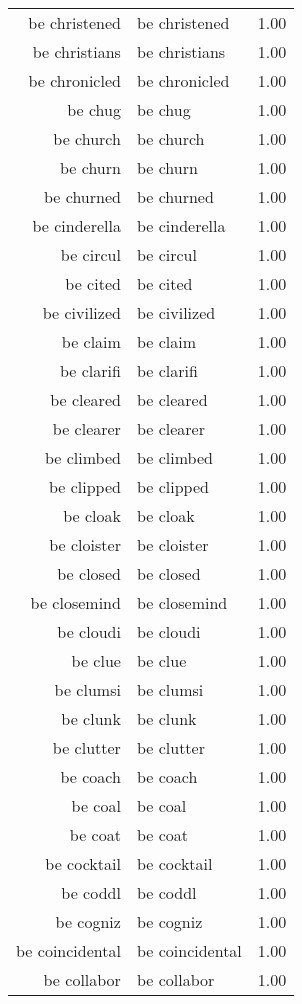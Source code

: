 \begin{table}[ht]
\begin{tabular}{rlr}
  be christened & be christened & 1.00 \\ 
  be christians & be christians & 1.00 \\ 
  be chronicled & be chronicled & 1.00 \\ 
  be chug & be chug & 1.00 \\ 
  be church & be church & 1.00 \\ 
  be churn & be churn & 1.00 \\ 
  be churned & be churned & 1.00 \\ 
  be cinderella & be cinderella & 1.00 \\ 
  be circul & be circul & 1.00 \\ 
  be cited & be cited & 1.00 \\ 
  be civilized & be civilized & 1.00 \\ 
  be claim & be claim & 1.00 \\ 
  be clarifi & be clarifi & 1.00 \\ 
  be cleared & be cleared & 1.00 \\ 
  be clearer & be clearer & 1.00 \\ 
  be climbed & be climbed & 1.00 \\ 
  be clipped & be clipped & 1.00 \\ 
  be cloak & be cloak & 1.00 \\ 
  be cloister & be cloister & 1.00 \\ 
  be closed & be closed & 1.00 \\ 
  be closemind & be closemind & 1.00 \\ 
  be cloudi & be cloudi & 1.00 \\ 
  be clue & be clue & 1.00 \\ 
  be clumsi & be clumsi & 1.00 \\ 
  be clunk & be clunk & 1.00 \\ 
  be clutter & be clutter & 1.00 \\ 
  be coach & be coach & 1.00 \\ 
  be coal & be coal & 1.00 \\ 
  be coat & be coat & 1.00 \\ 
  be cocktail & be cocktail & 1.00 \\ 
  be coddl & be coddl & 1.00 \\ 
  be cogniz & be cogniz & 1.00 \\ 
  be coincidental & be coincidental & 1.00 \\ 
  be collabor & be collabor & 1.00 \\ 

\end{tabular}
\end{table}
